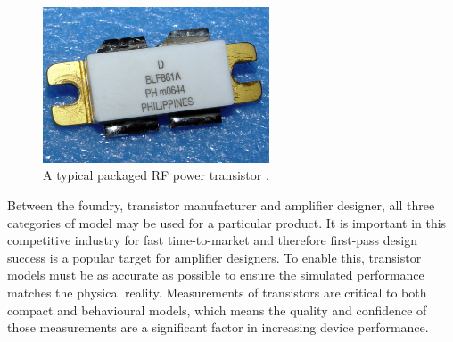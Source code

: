 \documentclass[../thesis/thesis.tex]{subfiles}
\begin{document}
\begin{figure}
	\centering
	\includegraphics[width=0.6\textwidth]{ch1_rfpa}
	\caption{A typical packaged RF power transistor \cite{blf861a}.}
	\label{ch1_fig_rfpa}
\end{figure}

Between the foundry, transistor manufacturer and amplifier designer, all three categories of model may be used for a particular product. It is important in this competitive industry for fast time-to-market and therefore first-pass design success is a popular target for amplifier designers. To enable this, transistor models must be as accurate as possible to ensure the simulated performance matches the physical reality. Measurements of transistors are critical to both compact and behavioural models, which means the quality and confidence of those measurements are a significant factor in increasing device performance.
\end{document}
